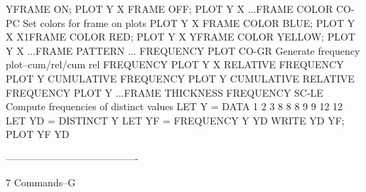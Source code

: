                                   YFRAME ON; PLOT Y X
                                  FRAME OFF; PLOT Y X
...FRAME COLOR              CO-PC Set colors for frame on plots
                                  PLOT Y X
                                  FRAME COLOR BLUE; PLOT Y X
                                  X1FRAME COLOR RED; PLOT Y X
                                  YFRAME COLOR YELLOW; PLOT Y X
...FRAME PATTERN
... FREQUENCY PLOT          CO-GR Generate frequency plot--cum/rel/cum rel
                                  FREQUENCY PLOT Y X
                                  RELATIVE FREQUENCY PLOT Y
                                  CUMULATIVE FREQUENCY PLOT Y
                                  CUMULATIVE RELATIVE FREQUENCY PLOT Y
...FRAME THICKNESS
FREQUENCY                   SC-LE Compute frequencies of distinct values
                                  LET Y = DATA 1 2 3 8 8 8 9 9 12 12
                                  LET YD = DISTINCT Y
                                  LET YF = FREQUENCY Y YD
                                  WRITE YD YF; PLOT YF YD
 
----------------------------------------
 
7
Commands--G
 
